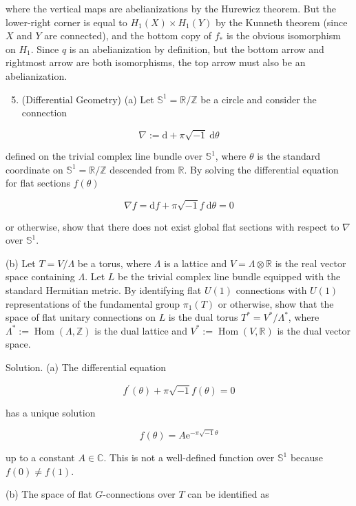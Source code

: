 \documentclass[10pt]{article}
\begin{document}
where the vertical maps are abelianizations by the Hurewicz theorem. But the lower-right corner is equal to $H_{1}(X) \times H_{1}(Y)$ by the Kunneth theorem (since $X$ and $Y$ are connected), and the bottom copy of $f_{*}$ is the obvious isomorphism on $H_{1}$. Since $q$ is an abelianization by definition, but the bottom arrow and rightmost arrow are both isomorphisms, the top arrow must also be an abelianization.

\begin{enumerate}
  \setcounter{enumi}{4}
  \item (Differential Geometry) (a) Let $\mathbb{S}^{1}=\mathbb{R} / \mathbb{Z}$ be a circle and consider the connection
\end{enumerate}

$$
\nabla:=\mathrm{d}+\pi \sqrt{-1} \mathrm{~d} \theta
$$

defined on the trivial complex line bundle over $\mathbb{S}^{1}$, where $\theta$ is the standard coordinate on $\mathbb{S}^{1}=\mathbb{R} / \mathbb{Z}$ descended from $\mathbb{R}$. By solving the differential equation for flat sections $f(\theta)$

$$
\nabla f=\mathrm{d} f+\pi \sqrt{-1} f \mathrm{~d} \theta=0
$$

or otherwise, show that there does not exist global flat sections with respect to $\nabla$ over $\mathbb{S}^{1}$.

(b) Let $T=V / \Lambda$ be a torus, where $\Lambda$ is a lattice and $V=\Lambda \otimes \mathbb{R}$ is the real vector space containing $\Lambda$. Let $L$ be the trivial complex line bundle equipped with the standard Hermitian metric. By identifying flat $U(1)$ connections with $U(1)$ representations of the fundamental group $\pi_{1}(T)$ or otherwise, show that the space of flat unitary connections on $L$ is the dual torus $T^{*}=V^{*} / \Lambda^{*}$, where $\Lambda^{*}:=\operatorname{Hom}(\Lambda, \mathbb{Z})$ is the dual lattice and $V^{*}:=\operatorname{Hom}(V, \mathbb{R})$ is the dual vector space.

Solution. (a) The differential equation

$$
f^{\prime}(\theta)+\pi \sqrt{-1} f(\theta)=0
$$

has a unique solution

$$
f(\theta)=A \mathrm{e}^{-\pi \sqrt{-1} \theta}
$$

up to a constant $A \in \mathbb{C}$. This is not a well-defined function over $\mathbb{S}^{1}$ because $f(0) \neq f(1)$.

(b) The space of flat $G$-connections over $T$ can be identified as
\end{document}
